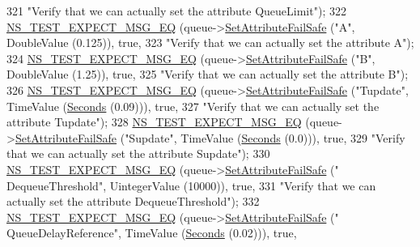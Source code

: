 \begin{DoxyCode}
321                          \textcolor{stringliteral}{"Verify that we can actually set the attribute QueueLimit"});
322   \hyperlink{group__testing_ga7304ba46a28d8cf08dfdfd6499cf7068}{NS\_TEST\_EXPECT\_MSG\_EQ} (queue->\hyperlink{classns3_1_1ObjectBase_aa7d333004e970f925a4ed5df275541b5}{SetAttributeFailSafe} (\textcolor{stringliteral}{"A"}, 
      DoubleValue (0.125)), \textcolor{keyword}{true},
323                          \textcolor{stringliteral}{"Verify that we can actually set the attribute A"});
324   \hyperlink{group__testing_ga7304ba46a28d8cf08dfdfd6499cf7068}{NS\_TEST\_EXPECT\_MSG\_EQ} (queue->\hyperlink{classns3_1_1ObjectBase_aa7d333004e970f925a4ed5df275541b5}{SetAttributeFailSafe} (\textcolor{stringliteral}{"B"}, 
      DoubleValue (1.25)), \textcolor{keyword}{true},
325                          \textcolor{stringliteral}{"Verify that we can actually set the attribute B"});
326   \hyperlink{group__testing_ga7304ba46a28d8cf08dfdfd6499cf7068}{NS\_TEST\_EXPECT\_MSG\_EQ} (queue->\hyperlink{classns3_1_1ObjectBase_aa7d333004e970f925a4ed5df275541b5}{SetAttributeFailSafe} (\textcolor{stringliteral}{"Tupdate"}, 
      TimeValue (\hyperlink{group__timecivil_ga33c34b816f8ff6628e33d5c8e9713b9e}{Seconds} (0.09))), \textcolor{keyword}{true},
327                          \textcolor{stringliteral}{"Verify that we can actually set the attribute Tupdate"});
328   \hyperlink{group__testing_ga7304ba46a28d8cf08dfdfd6499cf7068}{NS\_TEST\_EXPECT\_MSG\_EQ} (queue->\hyperlink{classns3_1_1ObjectBase_aa7d333004e970f925a4ed5df275541b5}{SetAttributeFailSafe} (\textcolor{stringliteral}{"Supdate"}, 
      TimeValue (\hyperlink{group__timecivil_ga33c34b816f8ff6628e33d5c8e9713b9e}{Seconds} (0.0))), \textcolor{keyword}{true},
329                          \textcolor{stringliteral}{"Verify that we can actually set the attribute Supdate"});
330   \hyperlink{group__testing_ga7304ba46a28d8cf08dfdfd6499cf7068}{NS\_TEST\_EXPECT\_MSG\_EQ} (queue->\hyperlink{classns3_1_1ObjectBase_aa7d333004e970f925a4ed5df275541b5}{SetAttributeFailSafe} (\textcolor{stringliteral}{"
      DequeueThreshold"}, UintegerValue (10000)), \textcolor{keyword}{true},
331                          \textcolor{stringliteral}{"Verify that we can actually set the attribute DequeueThreshold"});
332   \hyperlink{group__testing_ga7304ba46a28d8cf08dfdfd6499cf7068}{NS\_TEST\_EXPECT\_MSG\_EQ} (queue->\hyperlink{classns3_1_1ObjectBase_aa7d333004e970f925a4ed5df275541b5}{SetAttributeFailSafe} (\textcolor{stringliteral}{"
      QueueDelayReference"}, TimeValue (\hyperlink{group__timecivil_ga33c34b816f8ff6628e33d5c8e9713b9e}{Seconds} (0.02))), \textcolor{keyword}{true},

\end{DoxyCode}
